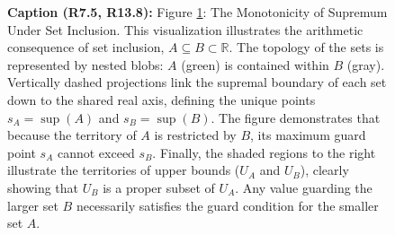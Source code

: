 \begin{figure}[H]

\smallskip
\noindent
\textbf{Caption (R7.5, R13.8):} 
Figure \ref{fig:supremum-algebra}: The Monotonicity of Supremum Under Set Inclusion.
This visualization illustrates the arithmetic consequence of set inclusion, $A \subseteq B \subset \mathbb{R}$. The topology of the sets is represented by nested blobs: $A$ (green) is contained within $B$ (gray). Vertically dashed projections link the supremal boundary of each set down to the shared real axis, defining the unique points $s_A = \operatorname{sup}(A)$ and $s_B = \operatorname{sup}(B)$. The figure demonstrates that because the territory of $A$ is restricted by $B$, its maximum guard point $s_A$ cannot exceed $s_B$. Finally, the shaded regions to the right illustrate the territories of upper bounds ($U_A$ and $U_B$), clearly showing that $U_B$ is a proper subset of $U_A$. Any value guarding the larger set $B$ necessarily satisfies the guard condition for the smaller set $A$.
\label{fig:supremum-algebra}
\end{figure}
